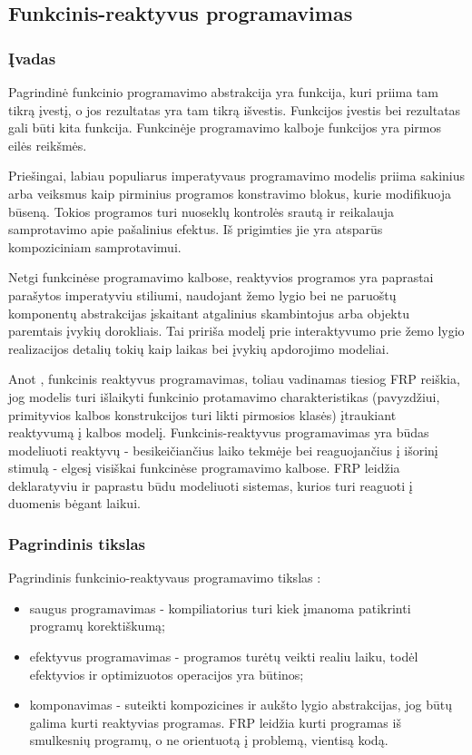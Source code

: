 \subsection{Funkcinis-reaktyvus programavimas}

\subsubsection{Įvadas}

Pagrindinė funkcinio programavimo abstrakcija yra funkcija, kuri priima tam tikrą įvestį, o jos rezultatas yra tam tikrą išvestis. Funkcijos įvestis bei rezultatas gali būti kita funkcija. Funkcinėje programavimo kalboje funkcijos yra pirmos eilės reikšmės.

Priešingai, labiau populiarus imperatyvaus programavimo modelis priima sakinius arba veiksmus kaip pirminius programos konstravimo blokus, kurie modifikuoja būseną. Tokios programos turi nuoseklų kontrolės srautą ir reikalauja samprotavimo apie pašalinius efektus. Iš prigimties jie yra atsparūs kompoziciniam samprotavimui.

Netgi funkcinėse programavimo kalbose, reaktyvios programos yra paprastai parašytos imperatyviu stiliumi, naudojant žemo lygio bei ne paruoštų komponentų abstrakcijas įskaitant atgalinius skambintojus arba objektu paremtais įvykių dorokliais. Tai pririša modelį prie interaktyvumo prie žemo lygio realizacijos detalių tokių kaip laikas bei įvykių apdorojimo modeliai.

Anot \cite{Survey}, funkcinis reaktyvus programavimas, toliau vadinamas tiesiog FRP reiškia, jog modelis turi išlaikyti funkcinio protamavimo charakteristikas (pavyzdžiui, primityvios kalbos konstrukcijos turi likti pirmosios klasės) įtraukiant reaktyvumą į kalbos modelį. Funkcinis-reaktyvus programavimas yra būdas modeliuoti reaktyvų - besikeičiančius laiko tekmėje bei reaguojančius į išorinį stimulą - elgesį visiškai funkcinėse programavimo kalbose. FRP leidžia deklaratyviu ir paprastu būdu modeliuoti sistemas, kurios turi reaguoti į duomenis bėgant laikui.

\subsubsection{Pagrindinis tikslas}

Pagrindinis funkcinio-reaktyvaus programavimo tikslas \cite{Survey}:

\begin{itemize}

	\item saugus programavimas - kompiliatorius turi kiek įmanoma patikrinti programų korektiškumą;

	\item efektyvus programavimas - programos turėtų veikti realiu laiku, todėl efektyvios ir optimizuotos operacijos yra būtinos;

	\item komponavimas - suteikti kompozicines ir aukšto lygio abstrakcijas, jog būtų galima kurti reaktyvias programas. FRP leidžia kurti programas iš smulkesnių programų, o ne orientuotą į problemą, vientisą kodą.

\end{itemize}

